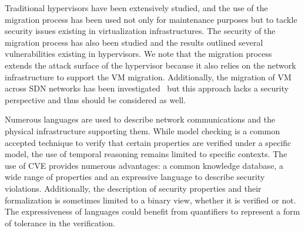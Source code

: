 Traditional hypervisors have been extensively studied, and the use of the migration process has been used not only for maintenance purposes but to tackle security issues existing in virtualization infrastructures.
The security of the migration process has also been studied and the results outlined several vulnerabilities existing in hypervisors.
We note that the migration process extends the attack surface of the hypervisor because it also relies on the network infrastructure to support the VM migration.
Additionally, the migration of VM across SDN networks has been investigated~\cite{Datacenters2014,Lin2013,Ibn-Khedher2015} but this approach lacks a security perspective and thus should be considered as well.

Numerous languages are used to describe network communications and the physical infrastructure supporting them. While model checking is a common accepted technique to verify that certain properties are verified under a specific model, the use of temporal reasoning remains limited to specific contexts.
The use of CVE provides numerous advantages: a common knowledge database, a wide range of properties and an expressive language to describe security violations.
Additionally, the description of security properties and their formalization is sometimes limited to a binary view, whether it is verified or not. The expressiveness of languages could benefit from quantifiers to represent a form of tolerance in the verification.


